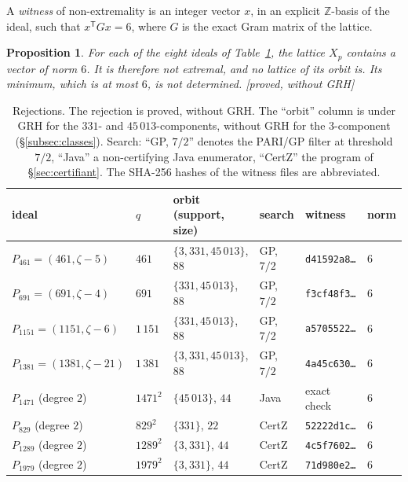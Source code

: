\documentclass[11pt,a4paper]{amsart}
\theoremstyle{plain}
\newtheorem{proposition}[theorem]{Proposition}
\theoremstyle{definition}
\numberwithin{equation}{section}
\newcommand{\Z}{\mathbb{Z}}
\newcommand{\st}[1]{\textup{\textsf{\small[#1]}}}
\begin{document}
A \emph{witness} of non-extremality is an integer vector $x$, in an explicit $\Z$-basis of the ideal, such that $x^{\mathsf T}Gx=6$, where $G$ is the exact Gram matrix of the lattice.

\begin{proposition}\label{prop:rejets}
For each of the eight ideals of Table~\ref{tab:rejets}, the lattice $X_p$ contains a vector of norm $6$. It is therefore not extremal, and no lattice of its orbit is. Its minimum, which is at most $6$, is not determined. \st{proved, without GRH}
\end{proposition}

\begin{table}[ht]
\caption{Rejections. The rejection is proved, without GRH. The ``orbit'' column is under GRH for the $331$- and $45\,013$-components, without GRH for the $3$-component (\S\ref{subsec:classes}). Search: ``GP, $7/2$'' denotes the PARI/GP filter at threshold $7/2$, ``Java'' a non-certifying Java enumerator, ``CertZ'' the program of \S\ref{sec:certifiant}. The SHA-256 hashes of the witness files are abbreviated.}\label{tab:rejets}
\centering\small\setlength{\tabcolsep}{4pt}
\begin{tabular}{llllll}
\toprule
ideal & $q$ & orbit (support, size) & search & witness & norm \\
\midrule
$P_{461}=(461,\zeta-5)$ & $461$ & $\{3,331,45\,013\}$, $88$ & GP, $7/2$ & \texttt{d41592a8\dots} & $6$ \\
$P_{691}=(691,\zeta-4)$ & $691$ & $\{331,45\,013\}$, $88$ & GP, $7/2$ & \texttt{f3cf48f3\dots} & $6$ \\
$P_{1151}=(1151,\zeta-6)$ & $1\,151$ & $\{331,45\,013\}$, $88$ & GP, $7/2$ & \texttt{a5705522\dots} & $6$ \\
$P_{1381}=(1381,\zeta-21)$ & $1\,381$ & $\{3,331,45\,013\}$, $88$ & GP, $7/2$ & \texttt{4a45c630\dots} & $6$ \\
$P_{1471}$ (degree $2$) & $1471^2$ & $\{45\,013\}$, $44$ & Java & exact check & $6$ \\
$P_{829}$ (degree $2$) & $829^2$ & $\{331\}$, $22$ & CertZ & \texttt{52222d1c\dots} & $6$ \\
$P_{1289}$ (degree $2$) & $1289^2$ & $\{3,331\}$, $44$ & CertZ & \texttt{4c5f7602\dots} & $6$ \\
$P_{1979}$ (degree $2$) & $1979^2$ & $\{3,331\}$, $44$ & CertZ & \texttt{71d980e2\dots} & $6$ \\
\bottomrule
\end{tabular}
\end{table}
\end{document}
